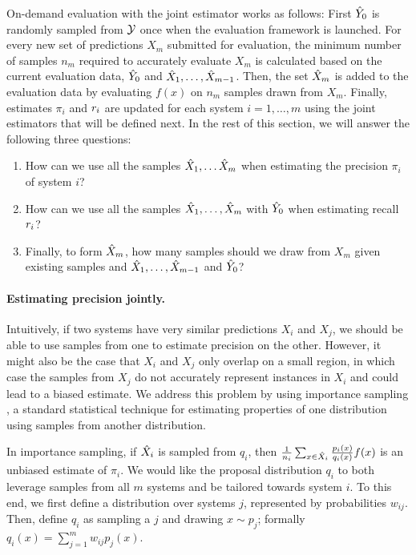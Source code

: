 On-demand evaluation with the joint estimator works as follows:
First ${\hat{Y}}_0$ is randomly sampled from $\mathcal{Y}$ once when the evaluation framework is launched.
For every new set of predictions $X_m$ submitted for evaluation, the minimum number of samples $n_m$ required to accurately evaluate $X_m$ is calculated based on the current evaluation data, ${\hat{Y}}_0$ and ${\hat{X}}_1, \ldots, {\hat{X}}_{m-1}$.
Then, the set ${\hat{X}}_m$ is added to the evaluation data by evaluating $f(x)$ on $n_m$ samples drawn from $X_m$.
Finally, estimates $\pi_i$ and $r_i$ are updated for each system $i = 1,\ldots,m$ using the joint estimators that will be defined next.
In the rest of this section, we will answer the following three questions:
\begin{enumerate}
  \item How can we use all the samples ${\hat{X}}_1, \ldots {\hat{X}}_m$ when estimating the precision $\pi_i$ of system $i$?
  \item How can we use all the samples ${\hat{X}}_1, \ldots, {\hat{X}}_m$ with ${\hat{Y}}_0$ when estimating recall $r_i$?
  \item Finally, to form ${\hat{X}}_m$, how many samples should we draw from $X_m$ given existing samples and ${\hat{X}}_1, \ldots, {\hat{X}}_{m-1}$ and ${\hat{Y}}_0$?
\end{enumerate}

\paragraph{Estimating precision jointly.}
Intuitively, if two systems have very similar predictions $X_i$ and $X_j$, we should be able to use samples from one to estimate precision on the other.
However, it might also be the case that $X_i$ and $X_j$ only overlap on a small region, in which case the samples from $X_j$ do not accurately represent instances in $X_i$ and could lead to a biased estimate.
We address this problem by using importance sampling \citep{owen2013monte}, a standard statistical technique for estimating properties of one distribution using samples from another distribution.

In importance sampling, if ${\hat{X}}_i$ is sampled from $q_i$, then $\frac{1}{n_i} \sum_{x \in {\hat{X}}_i} \frac{p_i(x)}{q_i(x)} f(x)$ is an unbiased estimate of $\pi_i$.
We would like the proposal distribution $q_i$ to both leverage samples from all $m$ systems and be tailored towards system $i$.
To this end, we first define a distribution over systems $j$, represented by probabilities $w_{ij}$.
Then, define $q_i$ as sampling a $j$ and drawing $x \sim p_j$;
formally $q_i(x) = \sum_{j=1}^m w_{ij} p_j(x)$.

